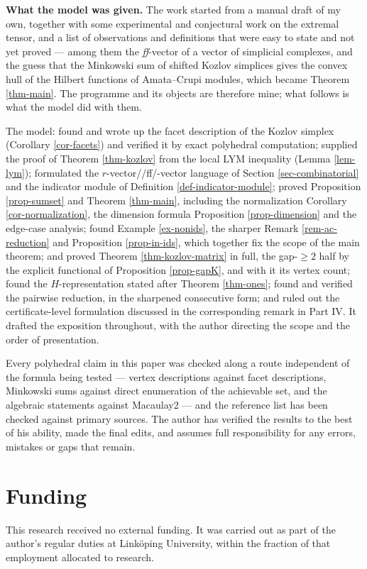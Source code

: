 \documentclass[11pt, a4paper, abstract=yes]{scrartcl}
\theoremstyle{definition}
\theoremstyle{remark}
\theoremstyle{plain}
\begin{document}
\textbf{What the model was given.} The work started from a manual draft of my own, together with some
experimental and conjectural work on the extremal tensor, and a list of observations and
definitions that were easy to state and not yet proved --- among them the \emph{ff}-vector of a vector
of simplicial complexes, and the guess that the Minkowski sum of shifted Kozlov simplices gives the
convex hull of the Hilbert functions of Amata--Crupi modules, which became Theorem \ref{thm-main}.
The programme and its objects are therefore mine; what follows is what the model did with them.

The model: found and wrote up the facet description of the Kozlov simplex (Corollary \ref{cor-facets})
and verified it by exact polyhedral computation; supplied the proof of Theorem \ref{thm-kozlov} from the
local LYM inequality (Lemma \ref{lem-lym}); formulated the \(r\)-vector//ff/-vector language of
Section \ref{sec-combinatorial} and the indicator module of Definition \ref{def-indicator-module}; proved
Proposition \ref{prop-sumset} and Theorem \ref{thm-main}, including the normalization
Corollary \ref{cor-normalization}, the dimension formula Proposition \ref{prop-dimension} and the edge-case
analysis; found Example \ref{ex-nonids}, the sharper Remark \ref{rem-ac-reduction} and
Proposition \ref{prop-in-ids}, which together fix the scope of the main theorem; and proved Theorem \ref{thm-kozlov-matrix} in full, the
gap-\(\ge2\) half by the explicit functional of Proposition \ref{prop-gapK}, and with it
its vertex count; found the \(H\)-representation stated after Theorem \ref{thm-ones}; found and
verified the pairwise reduction, in the sharpened consecutive form; and ruled out the
certificate-level formulation discussed in the corresponding remark in Part IV. It
drafted the exposition throughout, with the author directing the scope and the order of
presentation.

Every polyhedral claim in this paper was checked along a route independent of the formula being
tested --- vertex descriptions against facet descriptions, Minkowski sums against direct enumeration
of the achievable set, and the algebraic statements against Macaulay2 --- and the reference list has
been checked against primary sources. The author has verified the results to the best of his ability,
made the final edits, and assumes full responsibility for any errors, mistakes or gaps that remain.
\section*{Funding}
\label{sec:org2d585af}
This research received no external funding. It was carried out as part of the author's regular duties
at Linköping University, within the fraction of that employment allocated to research.
\end{document}

